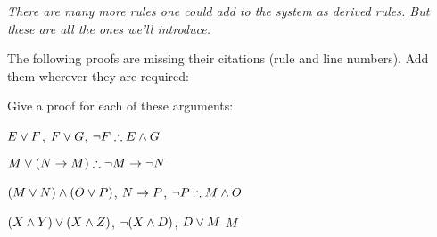 \emph{There are many more rules one could add to the system as derived rules. But these are all the ones we'll introduce.}

\begin{practiceproblems}
\solutions
\problempart
\label{pr.justifyTFLproof}
The following proofs are missing their citations (rule and line numbers). Add them wherever they are required:
\begin{multicols}{2}
\begin{pf}
 {}
 {}
\end{pf}
%
\vfill
%
\begin{pf}
\open
\close
\end{pf}
%
\columnbreak
%
\begin{pf}
\open
\close
{}
\open
\close
{}
\end{pf}
\end{multicols}

\problempart
Give a proof for each of these arguments:
\begin{earg}
\item $E\vee F$, $F\vee G$, $\enot F \therefore E \eand G$
\item $M\eor(N\eif M) \therefore \enot M \eif \enot N$
\item $(M \vee N) \mathbin{\wedge} (O \vee P)$, $N \rightarrow P$, $\enot P \therefore M\eand O$
\item $(X\mathbin{\wedge} Y)\vee(X\mathbin{\wedge} Z)$, $\neg(X\mathbin{\wedge} D)$, $D\vee M$ \therefore $M$
\end{earg}



\end{practiceproblems}

